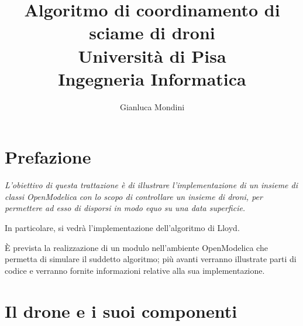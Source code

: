 \documentclass[11pt,a4paper]{report}
\author{Gianluca Mondini}
\title{Algoritmo di coordinamento di sciame di droni\\Università di Pisa\\Ingegneria Informatica}
\newcommand{\emptypage}[0]{\afterpage{\null\newpage}}
\begin{document}
\maketitle

\setlength{\parindent}{0pt}




\emptypage

\chapter*{Prefazione}


{\em \large
L'obiettivo di questa trattazione è di illustrare l'implementazione di un insieme di classi OpenModelica con lo scopo di controllare un insieme di droni, per permettere ad esso di disporsi in modo equo su una data superficie.

In particolare, si vedrà l'implementazione dell'algoritmo di Lloyd.

È prevista la realizzazione di un modulo nell'ambiente OpenModelica che permetta di simulare il suddetto algoritmo; più avanti verranno illustrate parti di codice e verranno fornite informazioni relative alla sua implementazione.
}
\pagebreak

\emptypage

\tableofcontents

\pagebreak

\emptypage

\chapter{Il drone e i suoi componenti}
\end{document}
